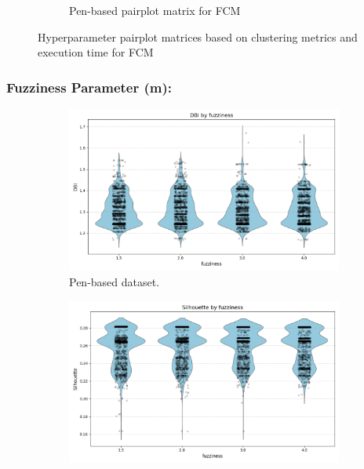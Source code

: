 \begin{figure}[H]
\begin{subfigure}{0.49\textwidth}
\caption{Pen-based pairplot matrix for FCM}
\end{subfigure}
\caption{Hyperparameter pairplot matrices based on clustering metrics and execution time for FCM}
\label{fig:pairplot_fuzzy}
\end{figure}



\subsubsection{Fuzziness Parameter (m):}

\begin{figure}[H]
	\centering
	\begin{subfigure}{0.32\textwidth}
		\centering
		\includegraphics[width=\linewidth]{figures/FuzzyCMeans/penBased_violin_fuzziness_vs_DBI}
		\caption{Pen-based dataset.}
	\end{subfigure}
	\begin{subfigure}{0.32\textwidth}
		\centering
		\includegraphics[width=\linewidth]{figures/FuzzyCMeans/mushroom_violin_fuzziness_vs_Silhouette}

\end{subfigure}
\end{figure}
